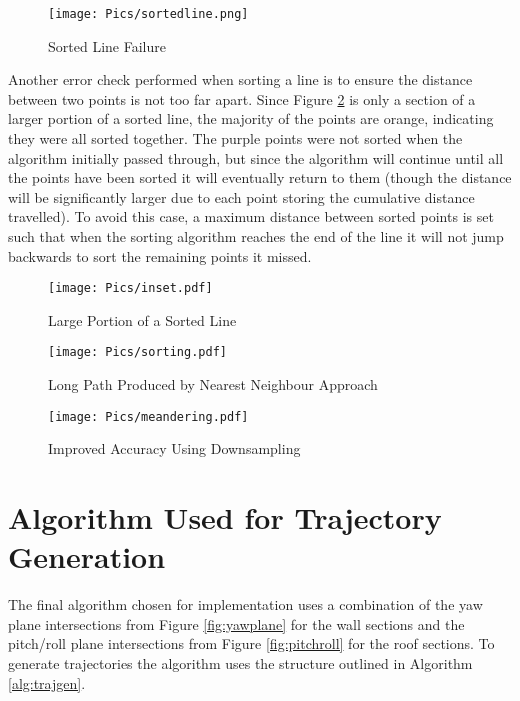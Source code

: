 \begin{figure}[H]
    \centering
    \texttt{[image: Pics/sortedline.png]}
    \caption{Sorted Line Failure}
    \label{fig:sline}
\end{figure}
Another error check performed when sorting a line is to ensure the distance between two points is not too far apart. Since Figure \ref{fig:inset} is only a section of a larger portion of a sorted line, the majority of the points are orange, indicating they were all sorted together. The purple points were not sorted when the algorithm initially passed through, but since the algorithm will continue until all the points have been sorted it will eventually return to them (though the distance will be significantly larger due to each point storing the cumulative distance travelled). To avoid this case, a maximum distance between sorted points is set such that when the sorting algorithm reaches the end of the line it will not jump backwards to sort the remaining points it missed.\\

\begin{figure}[H]
    \centering
    \texttt{[image: Pics/inset.pdf]}
    \caption{Large Portion of a Sorted Line}
    \label{fig:inset}
\end{figure}
\begin{figure}[H]
    \centering
    \texttt{[image: Pics/sorting.pdf]}
    \caption{Long Path Produced by Nearest Neighbour Approach}
    \label{fig:meandering}
\end{figure}
\begin{figure}[H]
    \centering
    \texttt{[image: Pics/meandering.pdf]}
    \caption{Improved Accuracy Using Downsampling}
    \label{fig:downsampledpath}
\end{figure}

\section{Algorithm Used for Trajectory Generation}


The final algorithm chosen for implementation uses a combination of the yaw plane intersections from Figure \ref{fig:yawplane} for the wall sections and the pitch/roll plane intersections from Figure \ref{fig:pitchroll} for the roof sections. To generate trajectories the algorithm uses the structure outlined in Algorithm \ref{alg:trajgen}.\\


